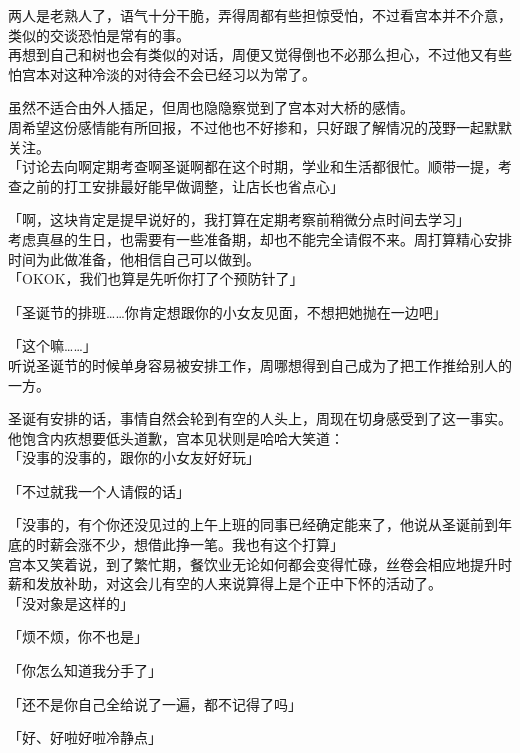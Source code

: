 两人是老熟人了，语气十分干脆，弄得周都有些担惊受怕，不过看宫本并不介意，类似的交谈恐怕是常有的事。\\

再想到自己和树也会有类似的对话，周便又觉得倒也不必那么担心，不过他又有些怕宫本对这种冷淡的对待会不会已经习以为常了。

虽然不适合由外人插足，但周也隐隐察觉到了宫本对大桥的感情。\\

周希望这份感情能有所回报，不过他也不好掺和，只好跟了解情况的茂野一起默默关注。\\

「讨论去向啊定期考查啊圣诞啊都在这个时期，学业和生活都很忙。顺带一提，考查之前的打工安排最好能早做调整，让店长也省点心」

「啊，这块肯定是提早说好的，我打算在定期考察前稍微分点时间去学习」\\

考虑真昼的生日，也需要有一些准备期，却也不能完全请假不来。周打算精心安排时间为此做准备，他相信自己可以做到。\\

「OKOK，我们也算是先听你打了个预防针了」

「圣诞节的排班……你肯定想跟你的小女友见面，不想把她抛在一边吧」

「这个嘛……」\\

听说圣诞节的时候单身容易被安排工作，周哪想得到自己成为了把工作推给别人的一方。

圣诞有安排的话，事情自然会轮到有空的人头上，周现在切身感受到了这一事实。他饱含内疚想要低头道歉，宫本见状则是哈哈大笑道：\\

「没事的没事的，跟你的小女友好好玩」

「不过就我一个人请假的话」

「没事的，有个你还没见过的上午上班的同事已经确定能来了，他说从圣诞前到年底的时薪会涨不少，想借此挣一笔。我也有这个打算」\\

宫本又笑着说，到了繁忙期，餐饮业无论如何都会变得忙碌，丝卷会相应地提升时薪和发放补助，对这会儿有空的人来说算得上是个正中下怀的活动了。\\

「没对象是这样的」

「烦不烦，你不也是」

「你怎么知道我分手了」

「还不是你自己全给说了一遍，都不记得了吗」

「好、好啦好啦冷静点」\\

